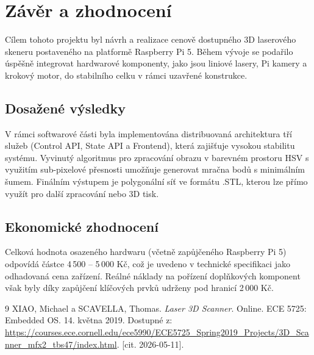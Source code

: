 \documentclass[12pt,a4paper]{report}
\begin{document}
\chapter{Závěr a zhodnocení}
Cílem tohoto projektu byl návrh a realizace cenově dostupného 3D laserového skeneru postaveného na platformě Raspberry Pi 5. Během vývoje se podařilo úspěšně integrovat hardwarové komponenty, jako jsou liniové lasery, Pi kamery a krokový motor, do stabilního celku v rámci uzavřené konstrukce.

\section{Dosažené výsledky}
V rámci softwarové části byla implementována distribuovaná architektura tří služeb (Control API, State API a Frontend), která zajišťuje vysokou stabilitu systému. Vyvinutý algoritmus pro zpracování obrazu v barevném prostoru HSV s využitím sub-pixelové přesnosti umožňuje generovat mračna bodů s minimálním šumem. Finálním výstupem je polygonální síť ve formátu .STL, kterou lze přímo využít pro další zpracování nebo 3D tisk.

\section{Ekonomické zhodnocení}
Celková hodnota osazeného hardwaru (včetně zapůjčeného Raspberry Pi 5) odpovídá částce 4\,500 -- 5\,000 Kč, což je uvedeno v technické specifikaci jako odhadovaná cena zařízení. Reálné náklady na pořízení doplňkových komponent však byly díky zapůjčení klíčových prvků udrženy pod hranicí 2\,000 Kč.

\begin{thebibliography}{9}
XIAO, Michael a SCAVELLA, Thomas. \textit{Laser 3D Scanner}. Online. ECE 5725: \mbox{Embedded} OS. 14. května 2019. Dostupné z: \url{https://courses.ece.cornell.edu/ece5990/ECE5725_Spring2019_Projects/3D_Scanner_mfx2_tbs47/index.html}. [cit. 2026-05-11].
\end{thebibliography}
\end{document}
